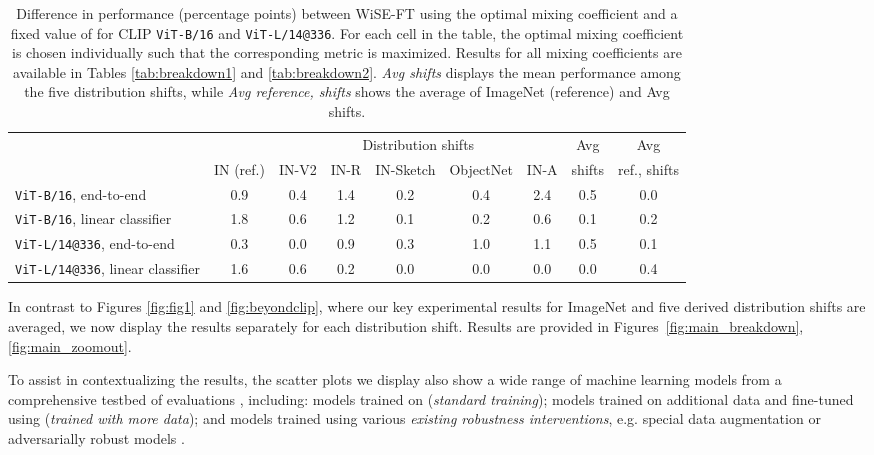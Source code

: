 \begin{table*}
\setlength\tabcolsep{5.1pt}
\small
\begin{center}
\begin{tabular}{lc|ccccc|cc}
\toprule
{} &            &             \multicolumn{5}{c|}{Distribution shifts}             & Avg &     Avg\\
{} &           IN (ref.) &             IN-V2 &              IN-R &                 IN-Sketch &                 ObjectNet &              IN-A & shifts &     ref., shifts\\
\midrule
\texttt{ViT-B/16}, end-to-end & 0.9 & 0.4 & 1.4 & 0.2 & 0.4 & 2.4 & 0.5 & 0.0 \\
\texttt{ViT-B/16}, linear classifier & 1.8 & 0.6 & 1.2 & 0.1 & 0.2 & 0.6 & 0.1 & 0.2 \\
\texttt{ViT-L/14@336}, end-to-end & 0.3 & 0.0 & 0.9 & 0.3 & 1.0 & 1.1 & 0.5 & 0.1 \\
\texttt{ViT-L/14@336}, linear classifier & 1.6 & 0.6 & 0.2 & 0.0 & 0.0 & 0.0 & 0.0 & 0.4 \\
\bottomrule
\end{tabular}
\caption{\label{tab:alpha}
Difference in performance (percentage points) between WiSE-FT using the optimal mixing coefficient and a fixed value of  for CLIP \texttt{ViT-B/16} and \texttt{ViT-L/14@336}. For each cell in the table, the optimal mixing coefficient  is chosen individually such that the corresponding metric is maximized.
Results for all mixing coefficients are available in Tables \ref{tab:breakdown1} and \ref{tab:breakdown2}. \textit{Avg shifts} displays the mean performance among the five distribution shifts, while \textit{Avg reference, shifts} shows the average of ImageNet (reference) and Avg shifts.
}
\end{center}
\end{table*}

In contrast to Figures \ref{fig:fig1} and \ref{fig:beyondclip}, where our key experimental results for ImageNet and five derived distribution shifts are averaged, we now display the results separately for each distribution shift. Results are provided in Figures~\ref{fig:main_breakdown}, \ref{fig:main_zoomout}. 

To assist in contextualizing the results, the scatter plots we display also show a wide range of machine learning models from a comprehensive testbed of evaluations \cite{taori2020measuring, miller21b}, including:
models trained on  (\textit{standard training}); models trained on additional data and fine-tuned using   
(\textit{trained with more data}); and models trained using various \textit{existing robustness interventions}, e.g. special data augmentation 
\cite{devries2017improved,engstrom2019exploring,geirhos2018imagenet,hendrycks2019augmix} or adversarially robust models \cite{madry2017towards, cohen2019certified,salman2019provably,shafahi2019adversarial}.

